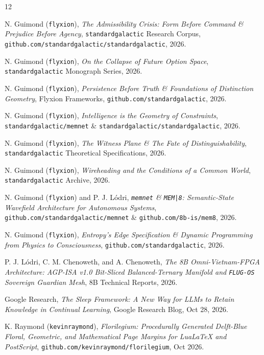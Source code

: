 \documentclass[10pt, twocolumn, a4paper]{article}
\begin{document}
\begin{thebibliography}{12}
\footnotesize

N. Guimond (\texttt{flyxion}), \textit{The Admissibility Crisis: Form Before Command \& Prejudice Before Agency}, \texttt{standardgalactic} Research Corpus, \texttt{github.com/standardgalactic/standardgalactic}, 2026.

N. Guimond (\texttt{flyxion}), \textit{On the Collapse of Future Option Space}, \texttt{standardgalactic} Monograph Series, 2026.

N. Guimond (\texttt{flyxion}), \textit{Persistence Before Truth \& Foundations of Distinction Geometry}, Flyxion Frameworks, \texttt{github.com/standardgalactic}, 2026.

N. Guimond (\texttt{flyxion}), \textit{Intelligence is the Geometry of Constraints}, \texttt{standardgalactic/memnet} \& \texttt{standardgalactic/standardgalactic}, 2026.

N. Guimond (\texttt{flyxion}), \textit{The Witness Plane \& The Fate of Distinguishability}, \texttt{standardgalactic} Theoretical Specifications, 2026.

N. Guimond (\texttt{flyxion}), \textit{Wireheading and the Conditions of a Common World}, \texttt{standardgalactic} Archive, 2026.

N. Guimond (\texttt{flyxion}) and P. J. Lódri, \textit{\texttt{memnet} \& \texttt{MEM|8}: Semantic-State Wavefield Architecture for Autonomous Systems}, \texttt{github.com/standardgalactic/memnet} \& \texttt{github.com/8b-is/mem8}, 2026.

N. Guimond (\texttt{flyxion}), \textit{Entropy's Edge Specification \& Dynamic Programming from Physics to Consciousness}, \texttt{github.com/standardgalactic}, 2026.

P. J. Lódri, C. M. Chenoweth, and A. Chenoweth, \textit{The 8B Omni-Vietnam-FPGA Architecture: AGP-ISA v1.0 Bit-Sliced Balanced-Ternary Manifold and \texttt{FLUG-OS} Sovereign Guardian Mesh}, 8B Technical Reports, 2026.

Google Research, \textit{The Sleep Framework: A New Way for LLMs to Retain Knowledge in Continual Learning}, Google Research Blog, Oct 28, 2026.

K. Raymond (\texttt{kevinraymond}), \textit{Florilegium: Procedurally Generated Delft-Blue Floral, Geometric, and Mathematical Page Margins for LuaLaTeX and PostScript}, \texttt{github.com/kevinraymond/florilegium}, Oct 2026.


\end{thebibliography}
\end{document}

